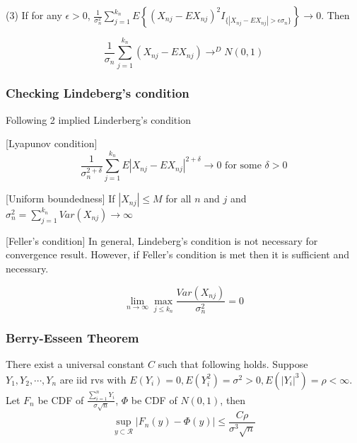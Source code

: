 (3) If for any $\epsilon > 0$, $\frac{1}{\sigma_n^2}\sum_{j=1}^{k_n}E\left\{(X_{nj}-EX_{nj})^2I_{\{|X_{nj}-EX_{nj}|>\epsilon\sigma_n\}}\right\}\rightarrow 0$. Then

$$
\frac{1}{\sigma_n}\sum_{j=1}^{k_n} (X_{nj}-EX_{nj})\rightarrow^D N(0, 1)
$$

\subsubsection{Checking Lindeberg's condition}

Following 2 implied Linderberg's condition

[Lyapunov condition]
$$
\frac{1}{\sigma_n^{2+\delta}}\sum_{j=1}^{k_n} E|X_{nj}-EX_{nj}|^{2+\delta}\rightarrow 0 \text{ for some } \delta > 0
$$

[Uniform boundedness]
If $|X_{nj}|\leq M$ for all $n$ and $j$ and $\sigma_n^2 = \sum_{j=1}^{k_n}Var(X_{nj})\rightarrow \infty$

[Feller's condition]
In general, Lindeberg's condition is not necessary for convergence result. However, if Feller's condition is met then it is sufficient and necessary.

$$
\lim_{n\rightarrow \infty} \max_{j\leq k_n} \frac{Var(X_{nj})}{\sigma_n^2} = 0
$$

\subsubsection{Berry-Esseen Theorem}
There exist a universal constant $C$ such that following holds. Suppose $Y_1, Y_2, \cdots, Y_n$ are iid rvs with $E(Y_i)=0, E(Y_i^2)=\sigma^2>0, E(|Y_i|^3)=\rho<\infty$. Let $F_n$ be CDF of $\frac{\sum_{i=1}^n Y_i}{\sigma\sqrt{n}}$, $\Phi$ be CDF of $N(0,1)$, then
$$
\sup_{y\subset\mathcal{R}}|F_n(y)-\Phi(y)|\leq \frac{C\rho}{\sigma^3\sqrt{n}}
$$